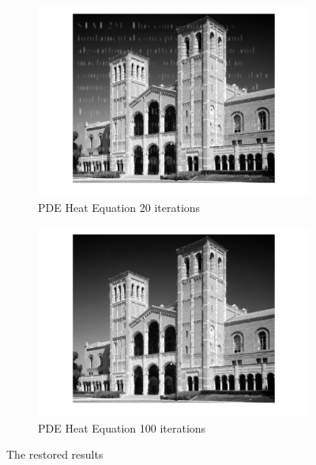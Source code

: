 \documentclass[11pt, oneside]{article}   	%
\begin{document}
\begin{figure}[H]
    \begin{subfigure}[b]{0.49\textwidth}
        \includegraphics[width=\textwidth]{plot3_20}
        \caption{PDE Heat Equation 20 iterations}
        \label{fig:plot3_20}
    \end{subfigure}
    \begin{subfigure}[b]{0.49\textwidth}
        \includegraphics[width=\textwidth]{plot3_100}
        \caption{PDE Heat Equation 100 iterations}
        \label{fig:plot3_100}
    \end{subfigure}
    \caption{The restored results}\label{fig:results}
\end{figure}
\end{document}
